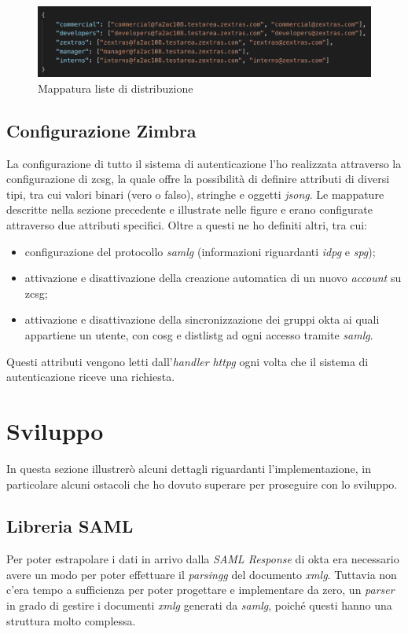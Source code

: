      \begin{figure}[ht]
        \centering
        \includegraphics[width=1\textwidth]{immagini/distListMapping.png}
        \caption{Mappatura liste di distribuzione}
        \label{fig: Mappatura liste di distribuzione}
    \end{figure}

\subsection{Configurazione Zimbra}
La configurazione di tutto il sistema di autenticazione l'ho realizzata attraverso la configurazione di \gls{zcsg}, la quale offre la possibilità di definire attributi di diversi tipi, tra cui valori binari (vero o falso), stringhe e oggetti \textit{\gls{jsong}}. Le mappature descritte nella sezione precedente e illustrate nelle figure  e  erano configurate attraverso due attributi specifici. Oltre a questi ne ho definiti altri, tra cui:
\begin{itemize}
    \item configurazione del protocollo \textit{\gls{samlg}} (informazioni riguardanti \textit{\gls{idpg}} e \textit{\gls{spg}});
    \item attivazione e disattivazione della creazione automatica di un nuovo \textit{account}  su \gls{zcsg};
    \item attivazione e disattivazione della sincronizzazione dei gruppi \gls{okta} ai quali appartiene un utente, con \gls{cosg} e \gls{distlistg} ad ogni accesso tramite \textit{\gls{samlg}}.
\end{itemize}
Questi attributi vengono letti dall'\textit{handler} \textit{\gls{httpg}} ogni volta che il sistema di autenticazione riceve una richiesta.

\section{Sviluppo}
In questa sezione illustrerò alcuni dettagli riguardanti l'implementazione, in particolare alcuni ostacoli che ho dovuto superare per proseguire con lo sviluppo.
\subsection{Libreria SAML} \label{sec:libreria}
Per poter estrapolare i dati in arrivo dalla \textit{SAML Response} di \gls{okta} era necessario avere un modo per poter effettuare il \textit{\gls{parsingg}} del documento \textit{\gls{xmlg}}. Tuttavia non c'era tempo a sufficienza per poter progettare e implementare da zero, un \textit{parser} in grado di gestire i documenti \textit{\gls{xmlg}} generati da \textit{\gls{samlg}}, poiché questi hanno una struttura molto complessa.

